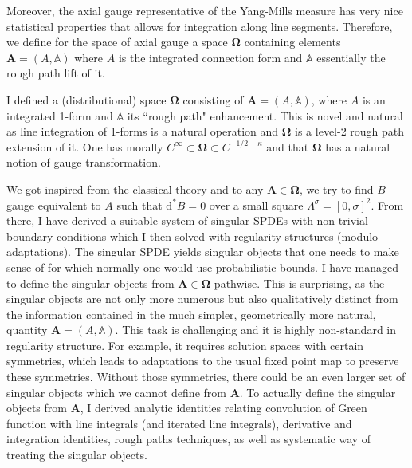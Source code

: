 \documentclass[11pt]{article}
\numberwithin{equation}{section}
\theoremstyle{definition}
\theoremstyle{remark}
\newcommand{\diff}{\mathrm{d}}
\newcommand{\1}{\mathbf 1}
\newcommand{\<}{\langle}
\renewcommand{\>}{\rangle}
\newcommand{\bfA}{\mathbf A}
\newcommand{\bA}{\mathbb A}
\newcommand{\bfOmega}{\boldsymbol{\Omega}}
\begin{document}
Moreover, the axial gauge representative of the Yang-Mills measure has very nice statistical properties that allows for integration along line segments. Therefore, we define for the space of axial gauge a space $\bfOmega$ containing elements $\bfA=(A,\bA)$ where $A$ is the integrated connection form and $\bA$ essentially the rough path lift of it. 


I defined a (distributional) space $\bfOmega$ consisting of $\bfA=(A,\bA)$, where $A$ is an integrated 1-form and  $\bA$ its ``rough path" enhancement. 
%
%
This is novel and natural as line integration of 1-forms is a natural operation and $\bfOmega$ is a level-2 rough path extension of it. 
%
One has morally $C^\infty\subset \bfOmega\subset C^{-1/2-\kappa}$ and that $\bfOmega$ has a natural notion of gauge transformation. 

We got inspired from the classical theory and to any $\bfA\in\bfOmega$,  we try to find $B$ gauge equivalent to $A$ such that $\diff^*B=0$ over a small square $\Lambda^\sigma=[0,\sigma]^2$. From there, I have derived a suitable system of singular SPDEs with non-trivial boundary conditions which I then solved with regularity structures (modulo adaptations). 
%
%
The singular SPDE yields singular objects 
that one needs to make sense of for which normally one would use probabilistic bounds. I have managed to define the singular objects from $\bfA\in\bfOmega$ pathwise. This is surprising, as the singular objects are not only more numerous but also qualitatively distinct from the information contained in the much simpler, geometrically more natural, quantity $\bfA=(A,\bA)$.  This task is challenging and it is highly non-standard in regularity structure. For example, it requires solution spaces  with certain symmetries, which leads to adaptations to the usual fixed point map to preserve these symmetries. Without those symmetries, there could be an even larger set of singular objects which we cannot define from $\bfA$. 
%
To actually define the singular objects from $\bfA$, I derived analytic identities relating convolution of Green function with line integrals (and iterated line integrals), derivative and integration identities, rough paths techniques, as well as systematic way of treating the singular objects. 
\end{document}
